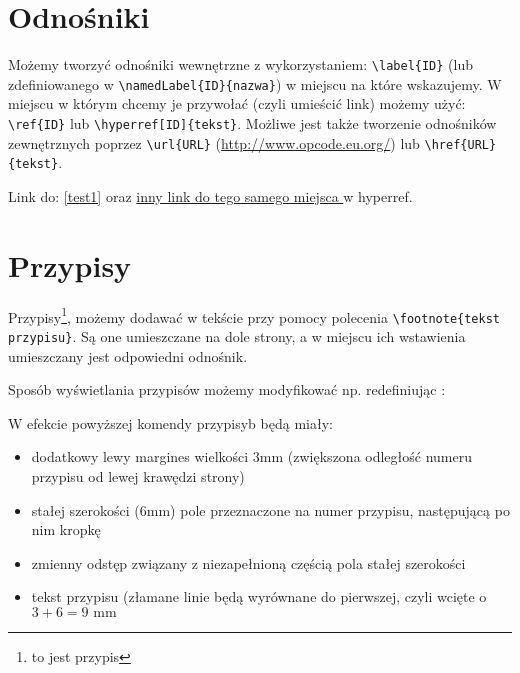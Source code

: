 \documentclass[fontSize=10pt,extra]{pdfArticle}
\begin{document}
\begin{Example}
\setcounter{tocdepth}{1}
\tableofcontents
\end{Example}

\section{Odnośniki}
Możemy tworzyć odnośniki wewnętrzne z wykorzystaniem: \Verb$\label{ID}$ (lub zdefiniowanego w  \Verb$\namedLabel{ID}{nazwa}$) w miejscu na które wskazujemy. W miejscu w którym chcemy je przywołać (czyli umieścić link) możemy użyć: \Verb$\ref{ID}$ lub \Verb$\hyperref[ID]{tekst}$.
Możliwe jest także tworzenie odnośników zewnętrznych poprzez \Verb$\url{URL}$ (\url{http://www.opcode.eu.org/}) lub \Verb$\href{URL}{tekst}$.

\begin{Example}
Link do: \ref{test1} oraz \hyperref[test1]{
	inny link do tego samego miejsca
} w hyperref.
\end{Example}


\section{Przypisy}

Przypisy\footnote{to jest przypis}, możemy dodawać w tekście przy pomocy polecenia \Verb$\footnote{tekst przypisu}$. Są one umieszczane na dole strony, a w miejscu ich wstawienia umieszczany jest odpowiedni odnośnik.

Sposób wyświetlania przypisów możemy modyfikować np. redefiniując \@makefntext:
\begin{MintedCode}
\makeatletter\renewcommand{\@makefntext}[1]{%
  \setlength{\@tempdima}{\columnwidth}\addtolength{\@tempdima}{-9mm}%
  \protect\footnotesize\hspace{3mm}\makebox[6mm][l]{\@thefnmark.}\parbox[t]{\@tempdima}{#1}%
}\makeatother
\end{MintedCode}
W efekcie powyższej komendy przypisyb będą miały:
\begin{itemize}
\item dodatkowy lewy margines wielkości 3mm (zwiększona odległość numeru przypisu od lewej krawędzi strony)
\item stałej szerokości (6mm) pole przeznaczone na numer przypisu, następującą po nim kropkę
\item zmienny odstęp związany z niezapełnioną częścią pola stałej szerokości
\item tekst przypisu (złamane linie będą wyrównane do pierwszej, czyli wcięte o $3+6 = 9\textrm{\ mm}$
\end{itemize}
\end{document}
